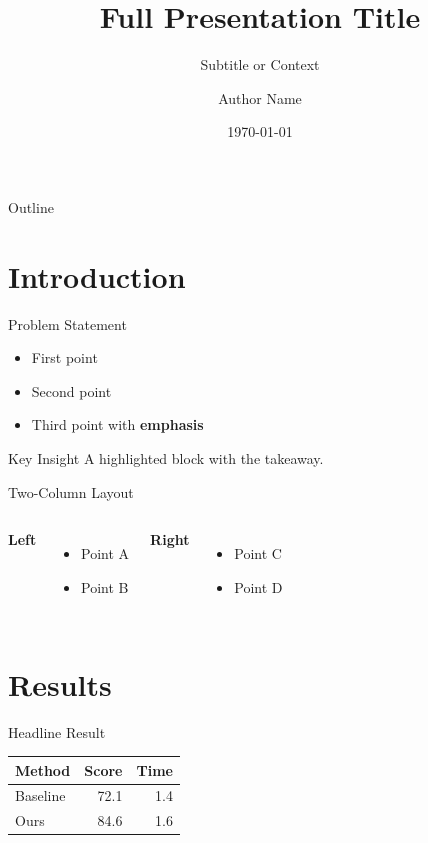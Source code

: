 \documentclass[aspectratio=169]{beamer}
\title[Short Title]{Full Presentation Title}
\subtitle{Subtitle or Context}
\author{Author Name}
\institute{Organization}
\date{\today}
\begin{document}
\begin{frame}
\titlepage
\end{frame}

\begin{frame}{Outline}
\tableofcontents
\end{frame}

\section{Introduction}

\begin{frame}{Problem Statement}
  \begin{itemize}
    \item First point
    \item Second point
    \item Third point with \textcolor{accent}{\textbf{emphasis}}
  \end{itemize}

  \vspace{1em}
  \begin{block}{Key Insight}
    A highlighted block with the takeaway.
  \end{block}
\end{frame}

\begin{frame}{Two-Column Layout}
  \begin{columns}[T]
    \textbf{Left}
    \begin{itemize}
      \item Point A
      \item Point B
    \end{itemize}

    \textbf{Right}
    \begin{itemize}
      \item Point C
      \item Point D
    \end{itemize}
  \end{columns}
\end{frame}

\section{Results}

\begin{frame}{Headline Result}
  \begin{table}
    \centering
    \begin{tabular}{lrr}
      \toprule
      Method & Score & Time \\
      \midrule
      Baseline & 72.1 & 1.4 \\
      Ours     & 84.6 & 1.6 \\
      \bottomrule
    \end{tabular}
  \end{table}
\end{frame}
\end{document}
